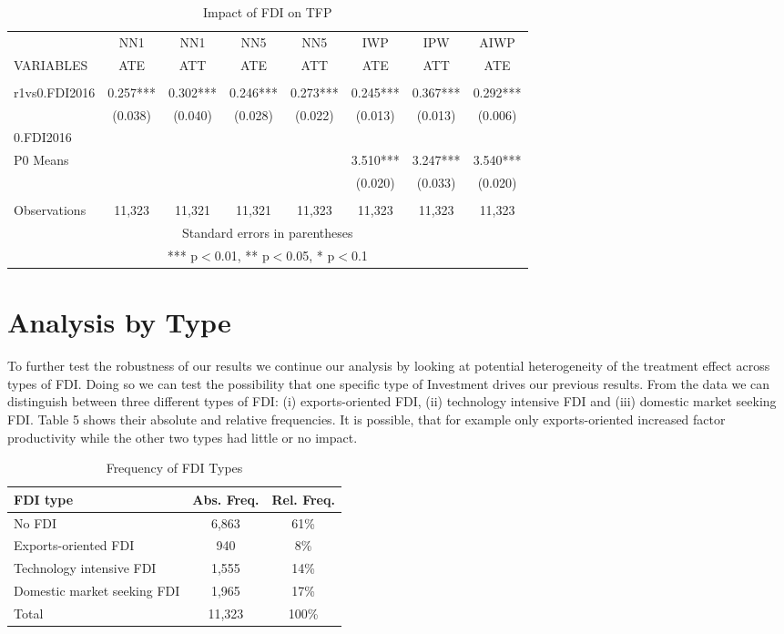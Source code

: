 \documentclass[a4paper,11pt]{scrartcl}
\begin{document}
\begin{table}[htbp]\centering
\caption{Impact of FDI on TFP}
\tiny
\begin{tabular}{lccccccc} \hline
 & NN1 & NN1 & NN5 & NN5 & IWP & IPW & AIWP \\
VARIABLES & ATE & ATT & ATE & ATT & ATE & ATT & ATE\\ \hline
 &  &  &  &  &  &  &  \\
r1vs0.FDI2016 & 0.257*** & 0.302*** & 0.246*** & 0.273*** & 0.245***   & 0.367*** & 0.292***  \\
 & (0.038) & (0.040) & (0.028) & (0.022) & (0.013)  & (0.013) & (0.006) \\
0.FDI2016 & & & & & &\\
P0  Means &  &  &  &    & 3.510***  & 3.247***& 3.540*** \\
 &  &  &  &  & (0.020)  & (0.033) & (0.020) \\
 &  &  &  &  &  &  &    \\
Observations & 11,323 & 11,321 & 11,321 & 11,323 & 11,323 & 11,323 & 11,323\\  \hline
\multicolumn{8}{c}{ Standard errors in parentheses} \\
\multicolumn{8}{c}{ *** p$<$0.01, ** p$<$0.05, * p$<$0.1} \\
\end{tabular}
\end{table}


\section{Analysis by Type}


To further test the robustness of our results  we continue our analysis by looking at potential heterogeneity of the treatment effect across types of FDI. Doing so we can test the possibility that one specific type of Investment drives our previous results. From the data we can distinguish between three different types of FDI: (i) exports-oriented FDI, (ii) technology intensive FDI and (iii) domestic market seeking FDI. Table 5 shows their absolute and relative frequencies. It is possible, that for example only exports-oriented increased factor productivity while the other two types had little or no impact.



\begin{table}

  \centering
   \caption{Frequency of FDI Types} 

\begin{tabular}{lcc} \hline
 FDI type&Abs. Freq.&Rel. Freq. \\
\hline
No FDI&6,863 & 61\% \\
Exports-oriented FDI&940 & 8\%\\
Technology intensive FDI & 1,555 & 14\% \\
Domestic market seeking FDI & 1,965 & 17\% \\
Total & 11,323 & 100\% \\
\end{tabular}
\end{table}
\end{document}

